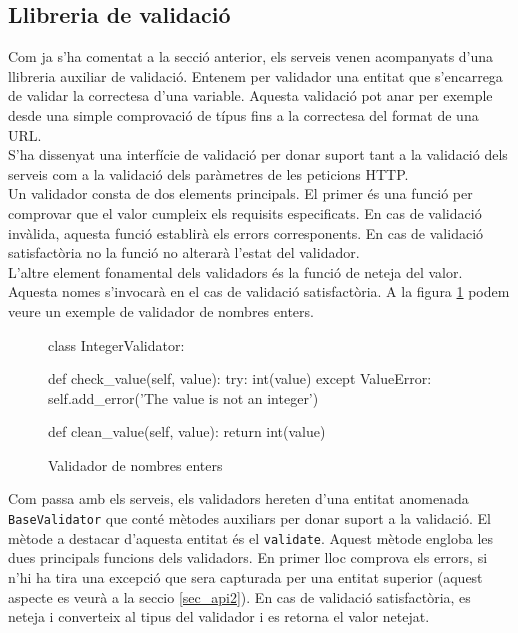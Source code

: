 	\subsection{Llibreria de validació} \label{validacio}
	
	Com ja s'ha comentat a la secció anterior, els serveis venen acompanyats d'una llibreria auxiliar de validació. Entenem per validador una entitat que s'encarrega de validar la correctesa d'una variable. Aquesta validació pot anar per exemple desde una simple comprovació de típus fins a la correctesa del format de una \ac{URL}. \\
	
	S'ha dissenyat una interfície de validació per donar suport tant a la validació dels serveis com a la validació dels paràmetres de les peticions \ac{HTTP}.\\
	
	Un validador consta de dos elements principals. El primer és una funció per comprovar que el valor cumpleix els requisits especificats. En cas de validació invàlida, aquesta funció establirà els errors corresponents. En cas de validació satisfactòria no la funció no alterarà l'estat del validador.\\
	
	L'altre element fonamental dels validadors és la funció de neteja del valor. Aquesta nomes s'invocarà en el cas de validació satisfactòria.  A la figura \ref{fig:int_validador} podem veure un exemple de validador de nombres enters.\\
	
	\begin{figure}[h!]
		\begin{python}
class IntegerValidator:

	def check_value(self, value):
		try:
			int(value)
		except ValueError:
			self.add_error('The value is not an integer')
			
	def clean_value(self, value):
		return int(value)
		\end{python}
		\caption{Validador de nombres enters}
		\label{fig:int_validador}
	\end{figure}	
	 
	 Com passa amb els serveis, els validadors hereten d'una entitat anomenada \texttt{BaseValidator} que conté mètodes auxiliars per donar suport a la validació. El mètode a destacar d'aquesta entitat és el \texttt{validate}. Aquest mètode engloba les dues principals funcions dels validadors. En primer lloc comprova els errors, si n'hi ha tira una excepció que sera capturada per una entitat superior (aquest aspecte es veurà a la seccio \ref{sec_api2}). En cas de validació satisfactòria, es neteja i converteix al tipus del validador i es retorna el valor netejat.
	 
